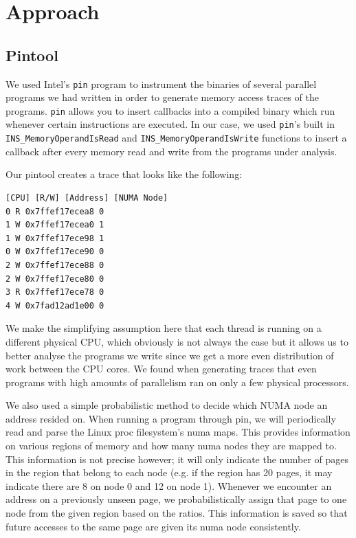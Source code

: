 \documentclass{article}
\begin{document}
\section{Approach}

\subsection{Pintool}
We used Intel's \texttt{pin} program to instrument the binaries of several parallel programs we had written in order to generate memory access traces of the programs.  \texttt{pin} allows you to insert callbacks into a compiled binary which run whenever certain instructions are executed.  In our case, we used \texttt{pin}'s built in \texttt{INS\_MemoryOperandIsRead} and \texttt{INS\_MemoryOperandIsWrite} functions to insert a callback after every memory read and write from the programs under analysis.

Our pintool creates a trace that looks like the following:
\begin{lstlisting}[numbers=none]
[CPU] [R/W] [Address] [NUMA Node]
0 R 0x7ffef17ecea8 0
1 W 0x7ffef17ecea0 1
1 W 0x7ffef17ece98 1
0 W 0x7ffef17ece90 0
2 W 0x7ffef17ece88 0
2 W 0x7ffef17ece80 0
3 R 0x7ffef17ece78 0
4 W 0x7fad12ad1e00 0
\end{lstlisting}

We make the simplifying assumption here that each thread is running on a different physical CPU, which obviously is not always the case but it allows us to better analyse the programs we write since we get a more even distribution of work between the CPU cores.  We found when generating traces that even programs with high amounts of parallelism ran on only a few physical processors.

We also used a simple probabilistic method to decide which NUMA node an address resided on.  When running a program through pin, we will periodically read and parse the Linux proc filesystem's numa maps.  This provides information on various regions of memory and how many numa nodes they are mapped to.  This information is not precise however; it will only indicate the number of pages in the region that belong to each node (e.g. if the region has 20 pages, it may indicate there are 8 on node 0 and 12 on node 1).  Whenever we encounter an address on a previously unseen page, we probabilistically assign that page to one node from the given region based on the ratios.  This information is saved so that future accesses to the same page are given its numa node consistently.
\end{document}
